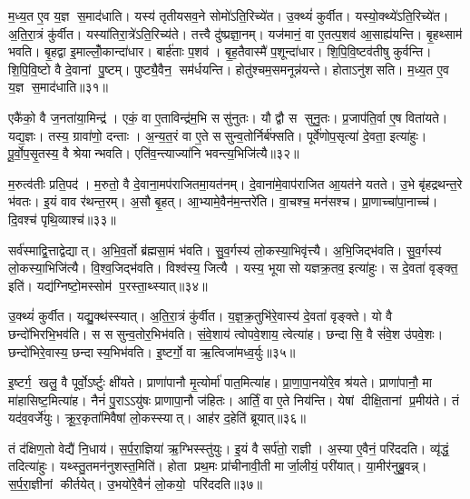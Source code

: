 म॒ध्य॒त ए॒व य॒ज्ञ स॒माद॑धाति। यस्य॑ तृतीयसव॒ने सोमो॑ऽति॒रिच्ये॑त। उ॒क्थ्यं॑ कुर्वीत। यस्यो॒क्थ्ये॑ऽति॒रिच्ये॑त। अ॒ति॒रा॒त्रं कु॑र्वीत। यस्या॑तिरा॒त्रे॑ऽति॒रिच्य॑ते। तत्त्वै दु॑ष्प्रज्ञा॒नम्। यज॑मानं॒ वा ए॒तत्प॒शव॑ आ॒साह्य॑यन्ति। बृ॒हथ्साम॑ भवति। बृ॒हद्वा इ॒माल्लोँ॒कान्दा॑धार। बार्\mbox{}ह॑ताः प॒शव॑। बृ॒ह॒तैवास्मै॑ प॒शून्दा॑धार। शि॒पि॒वि॒ष्टव॑तीषु कुर्वन्ति। शि॒पि॒वि॒ष्टो वै दे॒वानां पु॒ष्टम्। पुष्ट्यै॒वैन॒ सम॑र्धयन्ति। होतु॑श्चम॒समनून्न॑यन्ते। होताऽनु॑शसति। म॒ध्य॒त ए॒व य॒ज्ञ स॒माद॑धाति॥३१॥\anuvakamend[य॒न्ति॒ सव॑नस्याति॒रिच्य॑ते शसति दाधारा॒ष्टौ च॑]

एकै॑को॒ वै ज॒नता॑या॒मिन्द्र॑। एकं॒ वा ए॒ताविन्द्र॑म॒भि ससु॑नुतः। यौ द्वौ स सुनु॒तः। प्र॒जाप॑ति॒र्वा ए॒ष विता॑यते। यद्य॒ज्ञः। तस्य॒ ग्रावा॑णो॒ दन्ताः। अ॒न्य॒त॒रं वा ए॒ते ससुन्व॒तोर्निर्ब॑फ्सति। पूर्वे॑णोप॒सृत्या॑ दे॒वता॒ इत्या॑हुः। पू॒र्वो॒प॒सृ॒तस्य॒ वै श्रेयान्भवति। एति॑व॒न्त्याज्या॑नि भवन्त्य॒भिजि॑त्यै॥३२॥

म॒रुत्व॑तीः प्रति॒पद॑। म॒रुतो॒ वै दे॒वाना॒मप॑राजितमा॒यत॑नम्। दे॒वाना॑मे॒वाप॑राजित आ॒यत॑ने यतते। उ॒भे बृ॑हद्रथन्त॒रे भ॑वतः। इ॒यं वाव र॑थन्त॒रम्। अ॒सौ बृ॒हत्। आ॒भ्यामे॒वैन॑म॒न्तरे॑ति। वा॒चश्च॒ मन॑सश्च। प्रा॒णाच्चा॑पा॒नाच्च॑। दि॒वश्च॑ पृथि॒व्याश्च॑॥३३॥

सर्व॑स्माद्वि॒त्ताद्वेद्यात्। अ॒भि॒व॒र्तो ब्र॑ह्मसा॒मं भ॑वति। सु॒व॒र्गस्य॑ लो॒कस्या॒भिवृ॑त्त्यै। अ॒भि॒जिद्भ॑वति। सु॒व॒र्गस्य॑ लो॒कस्या॒भिजि॑त्यै। वि॒श्व॒जिद्भ॑वति। विश्व॑स्य॒ जित्यै। यस्य॒ भूयासो यज्ञक्र॒तव॒ इत्या॑हुः। स दे॒वता॑ वृङ्क्त॒ इति॑। यद्य॑ग्निष्टो॒मस्सोम॑ प॒रस्ता॒थ्स्यात्॥३४॥

उ॒क्थ्यं॑ कुर्वीत। यद्यु॒क्थ॑स्स्यात्। अ॒ति॒रा॒त्रं कु॑र्वीत। य॒ज्ञ॒क्र॒तुभि॑रे॒वास्य॑ दे॒वता॑ वृङ्क्ते। यो वै छन्दो॑भिरभि॒भव॑ति। स ससुन्व॒तोर॒भिभ॑वति। सं॒वे॒शाय॑ त्वोपवे॒शाय॒ त्वेत्या॑ह। छन्दासि॒ वै सं॑वे॒श उ॑पवे॒शः। छन्दो॑भिरे॒वास्य॒ छन्दास्य॒भिभ॑वति। इ॒ष्टर्गो॒ वा ऋ॒त्विजा॑मध्व॒र्युः॥३५॥

इ॒ष्टर्ग॒ खलु॒ वै पूर्वो॒ऽर्ष्टुः क्षी॑यते। प्राणा॑पानौ मृ॒त्योर्मा॑ पात॒मित्या॑ह। प्रा॒णा॒पा॒नयो॑रे॒व श्र॑यते। प्राणा॑पानौ॒ मा मा॑हासिष्ट॒मित्या॑ह। नैनं॑ पु॒राऽऽयु॑षः प्राणापा॒नौ ज॑हितः। आर्तिं॒ वा ए॒ते निय॑न्ति। येषां दीक्षि॒तानां प्र॒मीय॑ते। तं यद॑व॒वर्जे॑युः। क्रू॒र॒कृता॑मिवैषां लो॒कस्स्यात्। आह॑र द॒हेति॑ ब्रूयात्॥३६॥

तं द॑क्षिण॒तो वेद्यै॑ नि॒धाय॑। स॒र्प॒रा॒ज्ञिया॑ ऋ॒ग्भिस्स्तु॑युः। इ॒यं वै सर्प॑तो॒ राज्ञी। अ॒स्या ए॒वैनं॒ परि॑ददति। व्यृ॑द्धं॒ तदित्या॑हुः। यथ्स्तु॒तमन॑नुशस्त॒मिति॑। होता प्रथ॒मः प्रा॑चीनावी॒ती मार्जा॒लीयं॒ परी॑यात्। या॒मीर॑नुब्रु॒वन्न्। स॒र्प॒रा॒ज्ञीनां कीर्तयेत्। उ॒भयो॑रे॒वैनं॑ लो॒कयो॒ परि॑ददति॥३७॥

